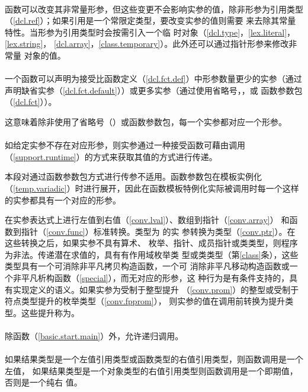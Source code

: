 \paragraph{} %
\begin{note}
  函数可以改变其非常量形参，但这些变更不会影响实参的值，除非形参为引用类型
  （\ref{dcl.ref}）；如果引用是一个常限定类型，要改变实参的值则需要
  来去除其常量特性。当形参为引用类型时会按需引入一个临
  时对象（\ref{dcl.type}，\ref{lex.literal}，\ref{lex.string}，
  \ref{dcl.array}，\ref{class.temporary}）。此外还可以通过指针形参来修改非常量
  对象的值。
\end{note}

\paragraph{} %
一个函数可以声明为接受比函数定义（\ref{dcl.fct.def}）中形参数量更少的实参（通过
声明缺省实参（\ref{dcl.fct.default}））或更多实参（通过使用省略号，，或
函数参数包（\ref{dcl.fct}））。

\begin{note}
  这意味着除非使用了省略号（）或函数参数包，每一个实参都对应一个形参。
\end{note}

\paragraph{} %
如给定实参不存在对应形参，则实参通过一种接受函数可藉由调用
（\ref{support.runtime}）的方式来获取其值的方式进行传递。

\begin{note}
  本段对通过函数参数包方式进行传参不适用。函数参数包在模板实例化
  （\ref{temp.variadic}）时进行展开，因此在函数模板特例化实际被调用时每一个这样
  的实参都具有一个对应的形参。
\end{note}

在实参表达式上进行左值到右值（\ref{conv.lval}）、数组到指针（\ref{conv.array}）
和函数到指针（\ref{conv.func}）标准转换。类型为 的实
参转换为类型（\ref{conv.ptr}）。在这些转换之后，如果实参不具有算术、
枚举、指针、成员指针或类类型，则程序为非法。传递潜在求值的，具有有作用域枚举类
型或类类型（第\ref{class}条），这些类型具有一个可消除非平凡拷贝构造函数，一个可
消除非平凡移动构造函数或一个非平凡析构函数（\ref{special}），而无对应的形参，这
种行为是有条件支持的，具有实现定义的语义。如果实参为受制于整型提升
（\ref{conv.prom}）的整型或受制于符点类型提升的枚举类型（\ref{conv.fpprom}），
则实参的值在调用前转换为提升类型。这些提升称为。

\paragraph{} %
除函数（\ref{basic.start.main}）外，允许递归调用。

\paragraph{} %
如果结果类型是一个左值引用类型或函数类型的右值引用类型，则函数调用是一个左值，
如果结果类型是一个对象类型的右值引用类型则函数调用是一个即期值，否则是一个纯右
值。
